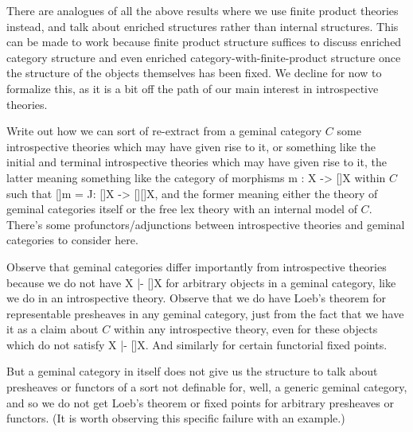 There are analogues of all the above results where we use finite product theories instead, and talk about enriched structures rather than internal structures. This can be made to work because finite product structure suffices to discuss enriched category structure and even enriched category-with-finite-product structure once the structure of the objects themselves has been fixed. We decline for now to formalize this, as it is a bit off the path of our main interest in introspective theories. 

\begin{TODOblock}
Write out how we can sort of re-extract from a geminal category $C$ some introspective theories which may have given rise to it, or something like the initial and terminal introspective theories which may have given rise to it, the latter meaning something like the category of morphisms m : X -> []X within $C$ such that []m = J: []X -> [][]X, and the former meaning either the theory of geminal categories itself or the free lex theory with an internal model of $C$. There's some profunctors/adjunctions between introspective theories and geminal categories to consider here.
\end{TODOblock}

\begin{TODOblock}
Observe that geminal categories differ importantly from introspective theories because we do not have X |- []X for arbitrary objects in a geminal category, like we do in an introspective theory. Observe that we do have Loeb's theorem for representable presheaves in any geminal category, just from the fact that we have it as a claim about $C$ within any introspective theory, even for these objects which do not satisfy X |- []X. And similarly for certain functorial fixed points.

But a geminal category in itself does not give us the structure to talk about presheaves or functors of a sort not definable for, well, a generic geminal category, and so we do not get Loeb's theorem or fixed points for arbitrary presheaves or functors. (It is worth observing this specific failure with an example.)
\end{TODOblock}

